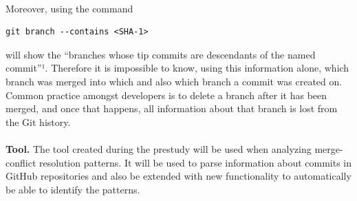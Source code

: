 \paragraph*{}
Moreover, using the command
\lstset{language=Bash}
\begin{lstlisting}[frame=single]
git branch --contains <SHA-1>
\end{lstlisting}
will show the “branches whose tip commits are descendants of the named commit”¹. Therefore it is impossible to know, using this information alone, which branch was merged into which and also which branch a commit was created on. Common practice amongst developers is to delete a branch after it has been merged, and once that happens, all information about that branch is lost from the Git history.
\paragraph*{}
\textbf{Tool.} The tool created during the prestudy will be used when analyzing merge-conflict resolution patterns. It will be used to parse information about commits in GitHub repositories and also be extended with new functionality to automatically be able to identify the patterns.
